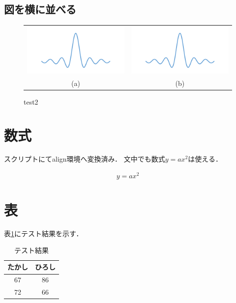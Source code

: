 \clearpage

\subsection{図を横に並べる}\label{ux56f3ux3092ux6a2aux306bux4e26ux3079ux308b}


\begin{figure}[ht]
\centering
\begin{tabular}[]{@{}cc@{}}

\includegraphics[width=8.00000cm]{./fig/sample.png} &
\includegraphics[width=8.00000cm]{./fig/sample.png}\\
(a) & (b)\\

\end{tabular}
\caption{test2}
\end{figure}

\section{数式}\label{ux6570ux5f0f}

スクリプトにてalign環境へ変換済み． 文中でも数式\(y=ax^2\)は使える．

\begin{align}
y=ax^2
\end{align}

\section{表}\label{ux8868}

表\ref{tab:test}にテスト結果を示す．

\begin{table}[ht]
\caption{テスト結果\label{tab:test}}
\centering
\begin{tabular}[]{@{}cc@{}}





\toprule
たかし & ひろし\\
\midrule

67 & 86\\
72 & 66\\
\bottomrule
\end{tabular}

\end{table}

